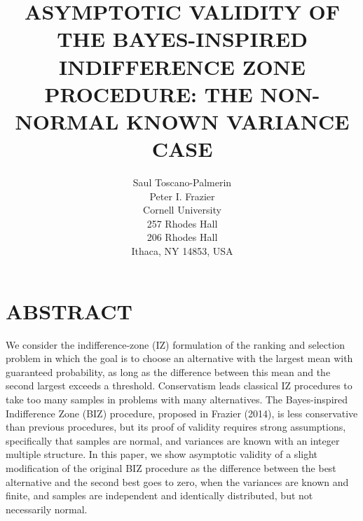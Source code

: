 \documentclass{wscpaperproc}
\theoremstyle{wsc}
\begin{document}
%
%

\title{ASYMPTOTIC VALIDITY OF THE BAYES-INSPIRED INDIFFERENCE ZONE PROCEDURE: 
THE NON-NORMAL KNOWN VARIANCE CASE}




\author{
	Saul Toscano-Palmerin\\ 
    	Peter I. Frazier\\[12pt]
	Cornell University \\
	257 Rhodes Hall \\
	206 Rhodes Hall \\
	Ithaca, NY 14853, USA\\
}





\maketitle



\section*{ABSTRACT}
We consider the indifference-zone (IZ) formulation of the ranking and selection problem in which the goal is to choose an alternative with the largest mean with guaranteed probability, as long as the difference between this mean and the second largest exceeds a threshold.
Conservatism leads classical IZ procedures to take too many samples in problems with many alternatives. The Bayes-inspired
Indifference Zone (BIZ) procedure, proposed in Frazier (2014), is
less conservative than previous procedures, but its proof of validity
requires strong assumptions, specifically that samples are normal, and variances are known 
with an integer multiple structure. In this paper, 
we show asymptotic validity of a slight modification of the original BIZ procedure 
as the difference between the best alternative and the second best goes to zero,
when the variances are known and finite, and samples are independent and identically distributed, but not necessarily normal.
\end{document}
